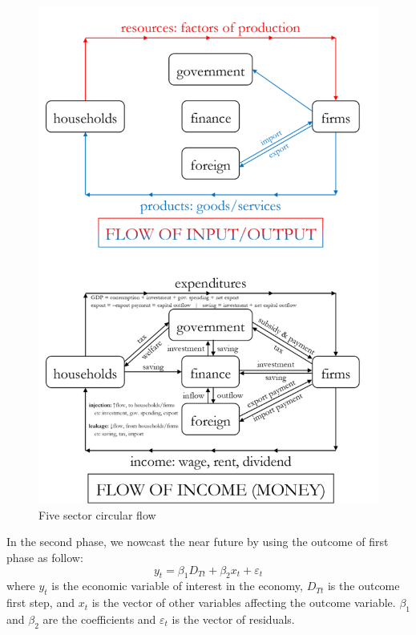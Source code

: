 \documentclass{article}
\begin{document}
  \begin{figure}
  	\includegraphics[width=\linewidth]{800px04circularflowdiagram.png}
  	\caption{Five sector circular flow}
  	\label{fig:1}
  \end{figure}
  	
  In the second phase, we nowcast the near future by using the outcome of first phase as follow: 
  \begin{equation}
  y_{t} = \beta_{1} D_{Tt} + \beta_{2} x_{t} + \varepsilon_{t}
  \end{equation}
  where $y_{t}$ is the economic variable of interest in the economy, $D_{Tt}$ is the outcome first step, and $x_{t}$ is the vector of other variables affecting the outcome variable. $\beta_{1}$ and $\beta_{2}$ are the coefficients and $\varepsilon_{t}$ is the vector of residuals. 
  	


\end{document}
